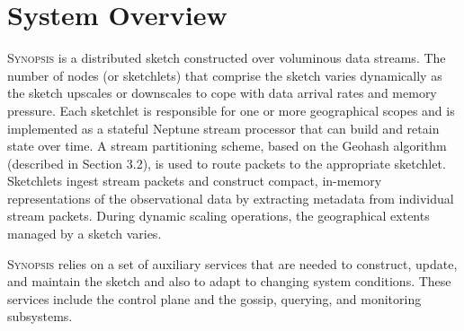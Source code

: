 \section{System Overview}
\label{sec:system}
\textsc{Synopsis} is a distributed sketch constructed over voluminous data streams.
The number of nodes (or sketchlets) that comprise the sketch varies dynamically as the sketch upscales or downscales to cope with data arrival rates and memory pressure.
Each sketchlet is responsible for one or more geographical scopes and is implemented as a stateful Neptune stream processor that can build and retain state over time.
A stream partitioning scheme, based on the Geohash algorithm (described in Section 3.2), is used to route packets to the appropriate sketchlet.
Sketchlets ingest stream packets and construct compact, in-memory representations of the observational data by extracting metadata from individual stream packets.
During dynamic scaling operations, the geographical extents managed by a sketch varies.

\textsc{Synopsis} relies on a set of auxiliary services that are needed to construct, update, and maintain the sketch and also to adapt to changing system conditions.
These services include the control plane and the gossip, querying, and monitoring subsystems.


